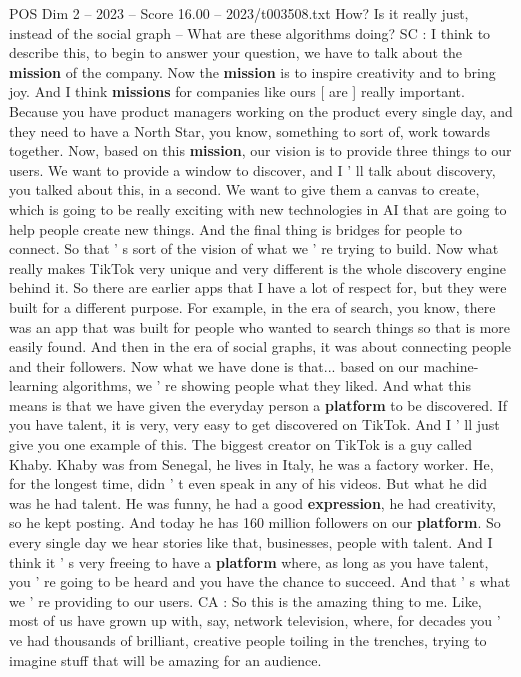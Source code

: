 \begin{textsample}{POS Dim 2 – 2023 – Score 16.00 – 2023/t003508.txt}
How?
Is it really just, instead of the social graph -- What are these algorithms doing?
SC : I think to describe this, to begin to answer your question, we have to talk about the \textbf{mission} of the company.
Now the \textbf{mission} is to inspire creativity and to bring joy.
And I think \textbf{missions} for companies like ours [ are ] really important.
Because you have product managers working on the product every single day, and they need to have a North Star, you know, something to sort of, work towards together.
Now, based on this \textbf{mission}, our vision is to provide three things to our users.
We want to provide a window to discover, and I ' ll talk about discovery, you talked about this, in a second.
We want to give them a canvas to create, which is going to be really exciting with new technologies in AI that are going to help people create new things.
And the final thing is bridges for people to connect.
So that ' s sort of the vision of what we ' re trying to build.
Now what really makes TikTok very unique and very different is the whole discovery engine behind it.
So there are earlier apps that I have a lot of respect for, but they were built for a different purpose.
For example, in the era of search, you know, there was an app that was built for people who wanted to search things so that is more easily found.
And then in the era of social graphs, it was about connecting people and their followers.
Now what we have done is that... based on our machine-learning algorithms, we ' re showing people what they liked.
And what this means is that we have given the everyday person a \textbf{platform} to be discovered.
If you have talent, it is very, very easy to get discovered on TikTok.
And I ' ll just give you one example of this.
The biggest creator on TikTok is a guy called Khaby.
Khaby was from Senegal, he lives in Italy, he was a factory worker.
He, for the longest time, didn ' t even speak in any of his videos.
But what he did was he had talent.
He was funny, he had a good \textbf{expression}, he had creativity, so he kept posting.
And today he has 160 million followers on our \textbf{platform}.
So every single day we hear stories like that, businesses, people with talent.
And I think it ' s very freeing to have a \textbf{platform} where, as long as you have talent, you ' re going to be heard and you have the chance to succeed.
And that ' s what we ' re providing to our users.
CA : So this is the amazing thing to me.
Like, most of us have grown up with, say, network television, where, for decades you ' ve had thousands of brilliant, creative people toiling in the trenches, trying to imagine stuff that will be amazing for an audience.

\end{textsample}
